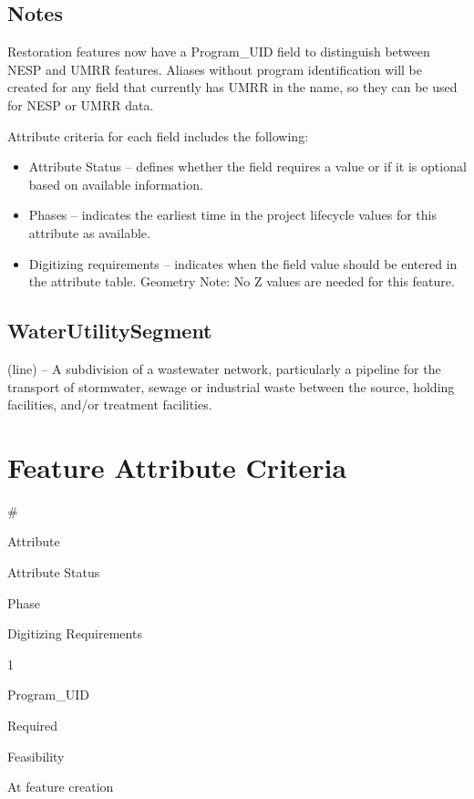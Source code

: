 \documentclass[
  letterpaper,
  DIV=11,
  numbers=noendperiod]{scrreprt}
\providecommand{\tightlist}{%
  \setlength{\itemsep}{0pt}\setlength{\parskip}{0pt}}
\begin{document}
\subsection{Notes}\label{notes-29}

Restoration features now have a Program\_UID field to distinguish
between NESP and UMRR features. Aliases without program identification
will be created for any field that currently has UMRR in the name, so
they can be used for NESP or UMRR data.

Attribute criteria for each field includes the following:

\begin{itemize}
\tightlist
\item
  Attribute Status -- defines whether the field requires a value or if
  it is optional based on available information.
\item
  Phases -- indicates the earliest time in the project lifecycle values
  for this attribute as available.
\item
  Digitizing requirements -- indicates when the field value should be
  entered in the attribute table. Geometry Note: No Z values are needed
  for this feature.
\end{itemize}

\subsection{WaterUtilitySegment}\label{waterutilitysegment}

(line) -- A subdivision of a wastewater network, particularly a pipeline
for the transport of stormwater, sewage or industrial waste between the
source, holding facilities, and/or treatment facilities.

\section{Feature Attribute
Criteria}\label{feature-attribute-criteria-26}

\#

Attribute

Attribute Status

Phase

Digitizing Requirements

1

Program\_UID

Required

Feasibility

At feature creation
\end{document}
